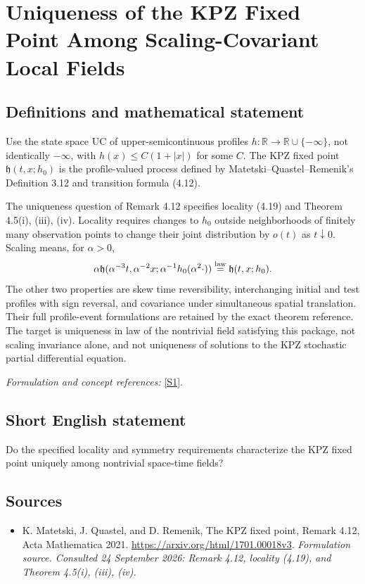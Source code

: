 \documentclass[11pt]{article}
\begin{document}
\section*{\texorpdfstring{Uniqueness of the KPZ Fixed Point Among Scaling-Covariant Local Fields}{Uniqueness of the KPZ Fixed Point Among Scaling-Covariant Local Fields}}\label{452}
\subsection{Definitions and mathematical statement}
Use the state space $\mathrm{UC}$ of upper-semicontinuous profiles $h:{\mathbb{R}}\to{\mathbb{R}}\cup\{-\infty\}$, not identically $-\infty$, with $h(x)\le C(1+|x|)$ for some $C$. The KPZ fixed point $\mathfrak h(t,x;h_0)$ is the profile-valued process defined by Matetski--Quastel--Remenik's Definition 3.12 and transition formula (4.12).

The uniqueness question of Remark 4.12 specifies locality (4.19) and Theorem 4.5(i), (iii), (iv). Locality requires changes to $h_0$ outside neighborhoods of finitely many observation points to change their joint distribution by $o(t)$ as $t\downarrow0$. Scaling means, for $\alpha>0$,
\[
 \alpha\mathfrak h(\alpha^{-3}t,\alpha^{-2}x;
       \alpha^{-1}h_0(\alpha^2\cdot))
 \overset{\rm law}=\mathfrak h(t,x;h_0).
\]
The other two properties are skew time reversibility, interchanging initial and test profiles with sign reversal, and covariance under simultaneous spatial translation. Their full profile-event formulations are retained by the exact theorem reference. The target is uniqueness in law of the nontrivial field satisfying this package, not scaling invariance alone, and not uniqueness of solutions to the KPZ stochastic partial differential equation.
\par\smallskip\textit{Formulation and concept references:} \href{https://arxiv.org/html/1701.00018v3}{[S1]}.

\subsection{Short English statement}
Do the specified locality and symmetry requirements characterize the KPZ fixed point uniquely among nontrivial space-time fields?
\subsection{Sources}
\begin{itemize}
\item[S1]K. Matetski, J. Quastel, and D. Remenik, The KPZ fixed point, Remark 4.12, Acta Mathematica 2021.
\url{https://arxiv.org/html/1701.00018v3}.
\textit{Formulation source. Consulted 24 September 2026: Remark 4.12, locality (4.19), and Theorem 4.5(i), (iii), (iv).}
\end{itemize}
\end{document}
